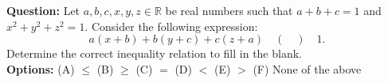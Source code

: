 \begin{examplebox}
\textbf{Question:} Let $a, b, c, x, y, z \in \mathbb{R}$ be real numbers such that $a + b + c = 1$ and $x^2 + y^2 + z^2 = 1$. Consider the following expression:
$$
a(x+b) + b(y+c) + c(z+a)  \quad (\quad) \quad 1.
$$
Determine the correct inequality relation to fill in the blank.\\

\textbf{Options:} (A) $\leq$ \quad(B) $\geq$ \quad (C) $=$  \quad (D) $<$ \quad  (E) $>$  \quad (F) None of the above

\end{examplebox}